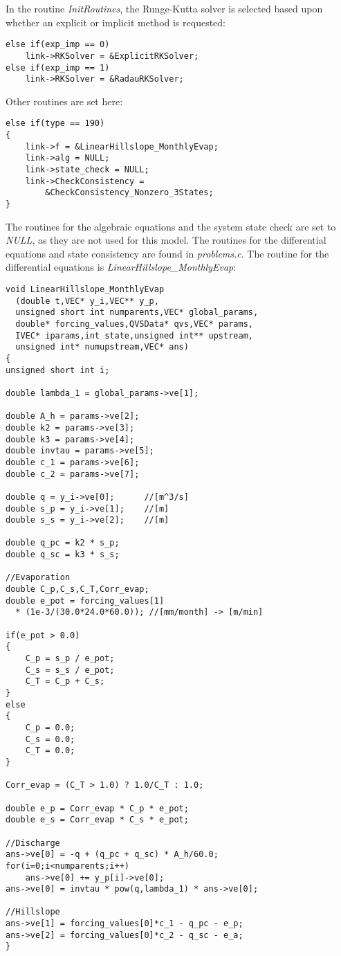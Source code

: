 \documentclass[12pt]{article}
\begin{document}
In the routine \emph{InitRoutines}, the Runge-Kutta solver is selected based upon whether an explicit or implicit method is requested:
\begin{lstlisting}[style=CStyle]
else if(exp_imp == 0)
	link->RKSolver = &ExplicitRKSolver;
else if(exp_imp == 1)
	link->RKSolver = &RadauRKSolver;
\end{lstlisting}
Other routines are set here:
\begin{lstlisting}[style=CStyle]
else if(type == 190)
{
	link->f = &LinearHillslope_MonthlyEvap;
	link->alg = NULL;
	link->state_check = NULL;
	link->CheckConsistency =
		&CheckConsistency_Nonzero_3States;
}
\end{lstlisting}
The routines for the algebraic equations and the system state check are set to \emph{NULL}, as they are not used for this model. The routines for the differential equations and state consistency are found in \emph{problems.c}. The routine for the differential equations is \emph{LinearHillslope\_MonthlyEvap}:
\begin{lstlisting}[style=CStyle]
void LinearHillslope_MonthlyEvap
  (double t,VEC* y_i,VEC** y_p,
  unsigned short int numparents,VEC* global_params,
  double* forcing_values,QVSData* qvs,VEC* params,
  IVEC* iparams,int state,unsigned int** upstream,
  unsigned int* numupstream,VEC* ans)
{
unsigned short int i;

double lambda_1 = global_params->ve[1];

double A_h = params->ve[2];
double k2 = params->ve[3];
double k3 = params->ve[4];
double invtau = params->ve[5];
double c_1 = params->ve[6];
double c_2 = params->ve[7];

double q = y_i->ve[0];		//[m^3/s]
double s_p = y_i->ve[1];	//[m]
double s_s = y_i->ve[2];	//[m]

double q_pc = k2 * s_p;
double q_sc = k3 * s_s;

//Evaporation
double C_p,C_s,C_T,Corr_evap;
double e_pot = forcing_values[1]
  * (1e-3/(30.0*24.0*60.0)); //[mm/month] -> [m/min]

if(e_pot > 0.0)
{
	C_p = s_p / e_pot;
	C_s = s_s / e_pot;
	C_T = C_p + C_s;
}
else
{
	C_p = 0.0;
	C_s = 0.0;
	C_T = 0.0;
}

Corr_evap = (C_T > 1.0) ? 1.0/C_T : 1.0;

double e_p = Corr_evap * C_p * e_pot;
double e_s = Corr_evap * C_s * e_pot;

//Discharge
ans->ve[0] = -q + (q_pc + q_sc) * A_h/60.0;
for(i=0;i<numparents;i++)
	ans->ve[0] += y_p[i]->ve[0];
ans->ve[0] = invtau * pow(q,lambda_1) * ans->ve[0];

//Hillslope
ans->ve[1] = forcing_values[0]*c_1 - q_pc - e_p;
ans->ve[2] = forcing_values[0]*c_2 - q_sc - e_a;
}
\end{lstlisting}
\end{document}
